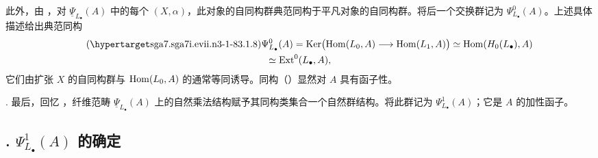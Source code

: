 此外，由 ，对 $\underline\Psi_{L_\bullet}(A)$ 中的每个 $(X,\alpha)$，此对象的自同构群典范同构于平凡对象的自同构群。将后一个交换群记为 $\Psi^0_{L_\bullet}(A)$。上述具体描述给出典范同构
\begin{multline}\tag{\SGARefTarget{sga7.sga7i.evii.n3-1-8}{3.1.8}}
 \Psi^0_{L_\bullet}(A)
 =\Ker\bigl(\Hom(L_0,A)\longrightarrow\Hom(L_1,A)\bigr)
 \simeq\Hom(H_0(L_\bullet),A)\\
 \simeq\Ext^0(L_\bullet,A),
\end{multline}
它们由扩张 $X$ 的自同构群与 $\operatorname{Hom}(L_0,A)$ 的通常等同诱导。同构（）显然对 $A$ 具有函子性。

. 最后，回忆 ，纤维范畴 $\underline\Psi_{L_\bullet}(A)$ 上的自然乘法结构赋予其同构类集合一个自然群结构。将此群记为 $\Psi^1_{L_\bullet}(A)$；它是 $A$ 的加性函子。




\subsection*{. $\Psi^1_{L_\bullet}(A)$ 的确定}

